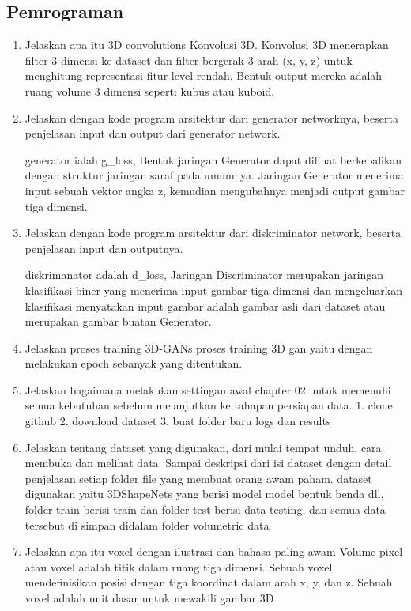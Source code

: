 \subsection{Pemrograman}
\begin{enumerate}
\item Jelaskan apa itu 3D convolutions
Konvolusi 3D. Konvolusi 3D menerapkan filter 3 dimensi ke dataset dan filter bergerak 3 arah (x, y, z) untuk menghitung representasi fitur level rendah. Bentuk output mereka adalah ruang volume 3 dimensi seperti kubus atau kuboid.

\item Jelaskan dengan kode program arsitektur dari generator networknya, beserta penjelasan input dan output dari generator network.

generator ialah g\_loss, Bentuk jaringan Generator dapat dilihat berkebalikan dengan struktur jaringan saraf pada umumnya. Jaringan Generator menerima input sebuah vektor angka z, kemudian mengubahnya menjadi output gambar tiga dimensi.

\item Jelaskan dengan kode program arsitektur dari diskriminator network, beserta penjelasan input dan outputnya.

diskrimanator adalah d\_loss, Jaringan Discriminator merupakan jaringan klasifikasi biner yang menerima input gambar tiga dimensi dan mengeluarkan klasifikasi menyatakan input gambar adalah gambar asli dari dataset atau merupakan gambar buatan Generator.

\item Jelaskan proses training 3D-GANs
proses training 3D gan yaitu dengan melakukan epoch sebanyak yang ditentukan.

\item Jelaskan bagaimana melakukan settingan awal chapter 02 untuk memenuhi semua kebutuhan sebelum melanjutkan ke tahapan persiapan data.
1. clone github										 2. download dataset 									3. buat folder baru logs dan results

\item Jelaskan tentang dataset yang digunakan, dari mulai tempat unduh, cara membuka dan melihat data. Sampai deskripsi dari isi dataset dengan detail penjelasan setiap folder file yang membuat orang awam paham.
dataset digunakan yaitu 3DShapeNets yang berisi model model bentuk benda dll, folder train berisi train dan folder test berisi data testing. dan semua data tersebut di simpan didalam folder volumetric data 

\item Jelaskan apa itu voxel dengan ilustrasi dan bahasa paling awam
Volume pixel atau voxel adalah titik dalam ruang tiga dimensi. Sebuah voxel mendefinisikan posisi dengan tiga koordinat dalam arah x, y, dan z. Sebuah voxel adalah unit dasar untuk mewakili gambar 3D


\end{enumerate}
